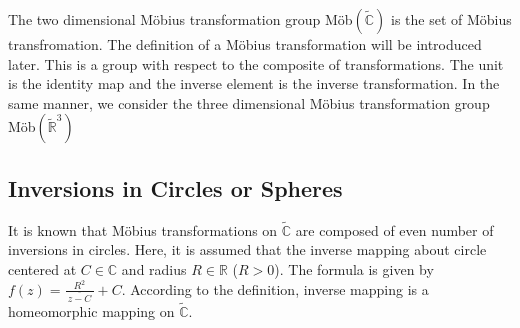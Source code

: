 The two dimensional M\"obius transformation group
\textrm{M\"ob}$(\tilde{\mathbb{C}})$
is the set of M\"obius transfromation. 
The definition of a M\"obius transformation will be introduced later. 
This is a group with respect to the composite of transformations.
The unit is the identity map and the inverse element is the 
inverse transformation. 
In the same manner, we consider the three dimensional M\"obius
transformation group
\textrm{M\"ob}$(\tilde{\mathbb{R}}^3)$

\subsection{Inversions in Circles or Spheres}

It is known that M\"obius transformations on $\tilde{\mathbb{C}}$
are composed of even number of inversions in circles.
Here, it is assumed that the inverse mapping about circle centered at
$C\in\mathbb{C}$ and radius $R\in\mathbb{R}$ ($R>0$).
The formula is given by
$f(z) = \frac{R^2}{~\overline{z -C}~} + C$.
According to the definition, inverse mapping is a homeomorphic mapping on
$\tilde{\mathbb{C}}$.

